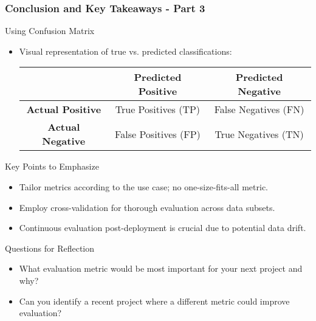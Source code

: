 \documentclass[aspectratio=169]{beamer}
\begin{document}
\begin{frame}[fragile]
  \frametitle{Conclusion and Key Takeaways - Part 3}

  \begin{block}{Using Confusion Matrix}
    \begin{itemize}
      \item Visual representation of true vs. predicted classifications:
      \begin{center}
      \begin{tabular}{|c|c|c|}
        \hline
                         & \textbf{Predicted Positive} & \textbf{Predicted Negative} \\
        \hline
        \textbf{Actual Positive} & True Positives (TP) & False Negatives (FN) \\
        \hline
        \textbf{Actual Negative} & False Positives (FP) & True Negatives (TN) \\
        \hline
      \end{tabular}
      \end{center}
    \end{itemize}
  \end{block}
  
  \begin{block}{Key Points to Emphasize}
    \begin{itemize}
      \item Tailor metrics according to the use case; no one-size-fits-all metric.
      \item Employ cross-validation for thorough evaluation across data subsets.
      \item Continuous evaluation post-deployment is crucial due to potential data drift.
    \end{itemize}
  \end{block}
  
  \begin{block}{Questions for Reflection}
    \begin{itemize}
      \item What evaluation metric would be most important for your next project and why?
      \item Can you identify a recent project where a different metric could improve evaluation?
    \end{itemize}
  \end{block}
\end{frame}
\end{document}
